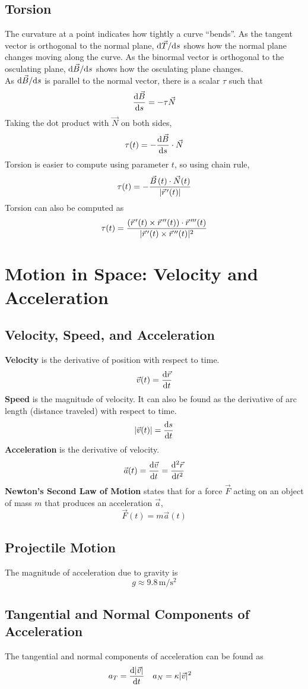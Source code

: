 \documentclass[../Calculus_\Roman{3}]{subfiles}
\begin{document}
			\subsection*{Torsion}
				The curvature at a point indicates how tightly a curve \enquote{bends}. As the tangent vector is orthogonal to the normal plane, $\mathrm{d}\vec{T}/\mathrm{d} s$ shows how the normal plane changes moving along the curve. As the binormal vector is orthogonal to the osculating plane, $\mathrm{d}\vec{B}/\mathrm{d} s$ shows how the osculating plane changes. \\
				As $\mathrm{d}\vec{B}/\mathrm{d} s$ is parallel to the normal vector, there is a scalar $\tau$ such that
					\[\frac{\mathrm{d} \vec{B}}{\mathrm{d} s} = -\tau\vec{N}\]
				Taking the dot product with $\vec{N}$ on both sides,
					\[\tau(t) = -\frac{\mathrm{d} \vec{B}}{\mathrm{d} s} \cdot \vec{N}\]
				Torsion is easier to compute using parameter $t$, so using chain rule, 
					\[\tau(t) = -\frac{\vec{B}\hspace{0.5mm}(t) \cdot \vec{N}(t)}{|\vec{r}\hspace{0.5mm}'(t)|}\]
				Torsion can also be computed as
					\[\tau(t) = \frac{(\vec{r}\hspace{0.5mm}'(t) \times \vec{r}\hspace{0.5mm}''(t)) \cdot \vec{r}\hspace{0.5mm}'''(t)}{|\vec{r}\hspace{0.5mm}'(t) \times \vec{r}\hspace{0.5mm}''(t)|^2}\]
		\section{Motion in Space: Velocity and Acceleration}
			\subsection*{Velocity, Speed, and Acceleration}
				\textbf{Velocity} is the derivative of position with respect to time.
					\[\vec{v}(t) = \frac{\mathrm{d} \vec{r}}{\mathrm{d} t}\]
				\textbf{Speed} is the magnitude of velocity. It can also be found as the derivative of arc length (distance traveled) with respect to time.
					\[|\vec{v}(t)| = \frac{\mathrm{d} s}{\mathrm{d} t}\]
				\textbf{Acceleration} is the derivative of velocity.
					\[\vec{a}(t) = \frac{\mathrm{d} \vec{v}}{\mathrm{d} t} = \frac{\mathrm{d} ^2\vec{r}}{\mathrm{d} t^2}\]
				\textbf{Newton's Second Law of Motion} states that for a force $\vec{F}$ acting on an object of mass $m$ that produces an acceleration $\vec{a}$,
					\[\vec{F}(t) = m\vec{a}(t)\]
			\subsection*{Projectile Motion}
					The magnitude of acceleration due to gravity is
						\[g \approx 9.8\,\mathrm{m/s^2}\]
			\subsection*{Tangential and Normal Components of Acceleration}
					 The tangential and normal components of acceleration can be found as
					 	\begin{align*}
					 		a_T &= \frac{\mathrm{d} |\vec{v}|}{\mathrm{d} t} &
					 				a_N &= \kappa|\vec{v}|^2	
					 	\end{align*}
\end{document}

